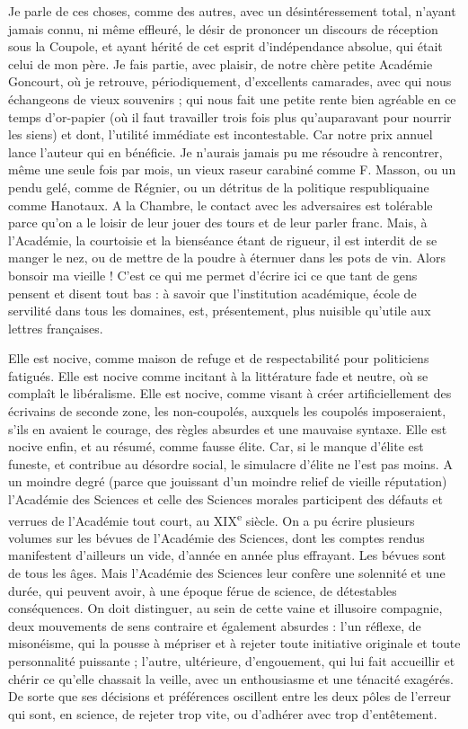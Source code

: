 \documentclass[french,twoside]{book} %
\begin{document}
Je parle de ces choses, comme des autres, avec un désintéressement total, n’ayant jamais connu, ni même effleuré, le désir de prononcer un discours de réception sous la Coupole, et ayant hérité de cet esprit d’indépendance absolue, qui était celui de mon père. Je fais partie, avec plaisir, de notre chère petite Académie Goncourt, où je retrouve, périodiquement, d’excellents camarades, avec qui nous échangeons de vieux souvenirs ; qui nous fait une petite rente bien agréable en ce temps d’or-papier (où il faut travailler trois fois plus qu’auparavant pour nourrir les siens) et dont, l’utilité immédiate est incontestable. Car notre prix annuel lance l’auteur qui en bénéficie. Je n’aurais jamais pu me résoudre à rencontrer, même une seule fois par mois, un vieux raseur carabiné comme F. Masson, ou un pendu gelé, comme de Régnier, ou un détritus de la politique respubliquaine comme Hanotaux. A la Chambre, le contact avec les adversaires est tolérable parce qu’on a le loisir de leur jouer des tours et de leur parler franc. Mais, à l’Académie, la courtoisie et la bienséance étant de rigueur, il est interdit de se manger le nez, ou de mettre de la poudre à éternuer dans les pots de vin. Alors bonsoir ma vieille ! C’est ce qui me permet d’écrire ici ce que tant de gens pensent et disent tout bas : à savoir que l’institution académique, école de servilité dans tous les domaines, est, présentement, plus nuisible qu’utile aux lettres françaises.\par
Elle est nocive, comme maison de refuge et de respectabilité pour politiciens fatigués. Elle est nocive comme incitant à la littérature fade et neutre, où se complaît le libéralisme. Elle est nocive, comme visant à créer artificiellement des écrivains de seconde zone, les non-coupolés, auxquels les coupolés imposeraient, s’ils en avaient le courage, des règles absurdes et une mauvaise syntaxe. Elle est nocive enfin, et au résumé, comme fausse élite. Car, si le manque d’élite est funeste, et contribue au désordre social, le simulacre d’élite ne l’est pas moins. A un moindre degré (parce que jouissant d’un moindre relief de vieille réputation) l’Académie des Sciences et celle des Sciences morales participent des défauts et verrues de l’Académie tout court, au XIX\textsuperscript{e} siècle. On a pu écrire plusieurs volumes sur les bévues de l’Académie des Sciences, dont les comptes rendus manifestent d’ailleurs un vide, d’année en année plus effrayant. Les bévues sont de tous les âges. Mais l’Académie des Sciences leur confère une solennité et une durée, qui peuvent avoir, à une époque férue de science, de détestables conséquences. On doit distinguer, au sein de cette vaine et illusoire compagnie, deux mouvements de sens contraire et également absurdes : l’un réflexe, de misonéisme, qui la pousse à mépriser et à rejeter toute initiative originale et toute personnalité puissante ; l’autre, ultérieure, d’engouement, qui lui fait accueillir et chérir ce qu’elle chassait la veille, avec un enthousiasme et une ténacité exagérés. De sorte que ses décisions et préférences oscillent entre les deux pôles de l’erreur qui sont, en science, de rejeter trop vite, ou d’adhérer avec trop d’entêtement.\par
\end{document}

